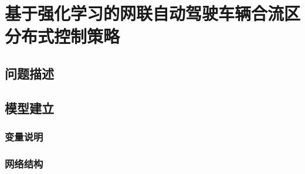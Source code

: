 \chapter{基于强化学习的网联自动驾驶车辆合流区分布式控制策略}

\section{问题描述}

\section{模型建立}

\subsection{变量说明}

\subsection{网络结构}